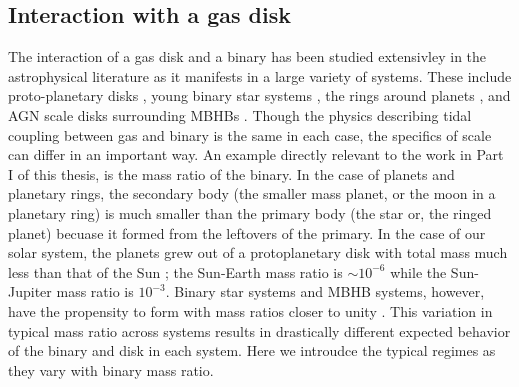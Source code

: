 
	
	


\subsection{Interaction with a gas disk}  
The interaction of a gas disk and a binary
has been studied extensivley in the astrophysical literature as it manifests
in a large variety of systems. These include proto-planetary disks \citep{},
young binary star systems \citep{}, the rings around planets \citep{GTSaturn},
and AGN scale disks surrounding MBHBs \citep{}. Though the physics describing
tidal coupling between gas and binary is the same in each case, the specifics
of scale can differ in an important way.  An example directly relevant to the
work in Part I of this thesis, is the mass ratio of the binary. In the case of
planets and planetary rings, the secondary body (the smaller mass planet, or
the moon in a planetary ring) is much smaller than the primary body (the star
or, the ringed planet) becuase it formed from the leftovers of the primary. In
the case of our solar system, the planets grew out of a protoplanetary disk
with total mass much less than that of the Sun \citep{}; the Sun-Earth mass
ratio is $\sim10^{-6}$ while the Sun-Jupiter mass ratio is $10^{-3}$. Binary
star systems and MBHB systems, however, have the propensity to form with mass
ratios closer to unity \citep{}. This variation in typical mass ratio across
systems results in drastically different expected behavior of the binary and
disk in each system. Here we introudce the typical regimes as they vary with
binary mass ratio.




